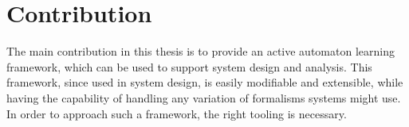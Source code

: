 \chapter{Contribution}

The main contribution in this thesis is to provide an active automaton learning framework, which can be used to support system design and analysis. This framework, since used in system design, is easily modifiable and extensible, while having the capability of handling any variation of formalisms systems might use.
\\
In order to approach such a framework, the right tooling is necessary.